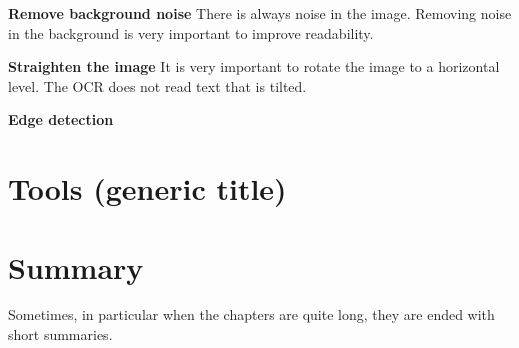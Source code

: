 \textbf{Remove background noise}
There is always noise in the image.
Removing noise in the background is very important to improve readability.

\textbf{Straighten the image}
It is very important to rotate the image to a horizontal level.
The OCR does not read text that is tilted.

\textbf{Edge detection}


\section{Tools (generic title)}\label{sec:tools-(generic-title)}

\section{Summary}\label{sec:summary}

Sometimes, in particular when the chapters are quite long, they are ended with short summaries.

